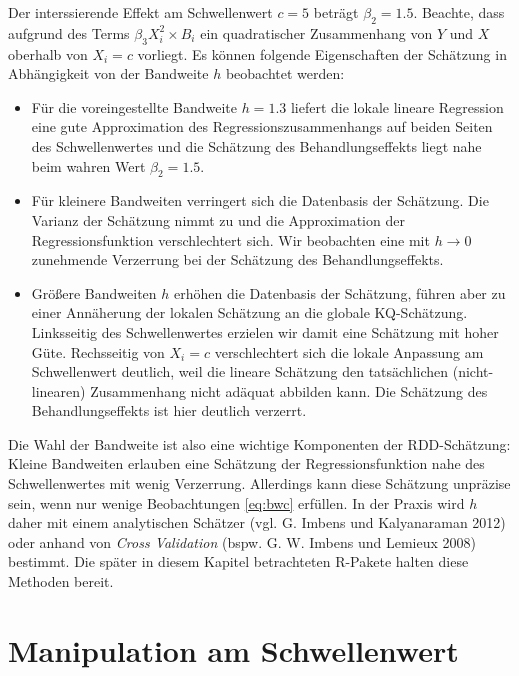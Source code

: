 \documentclass[
  a4paper,
  DIV=11,
  oneside]{scrreprt}
\begin{document}
Der interssierende Effekt am Schwellenwert \(c=5\) beträgt
\(\beta_2 = 1.5\). Beachte, dass aufgrund des Terms
\(\beta_3 X_i^2 \times B_i\) ein quadratischer Zusammenhang von \(Y\)
und \(X\) oberhalb von \(X_i = c\) vorliegt. Es können folgende
Eigenschaften der Schätzung in Abhängigkeit von der Bandweite \(h\)
beobachtet werden:

\begin{itemize}
\item
  Für die voreingestellte Bandweite \(h = 1.3\) liefert die lokale
  lineare Regression eine gute Approximation des
  Regressionszusammenhangs auf beiden Seiten des Schwellenwertes und die
  Schätzung des Behandlungseffekts liegt nahe beim wahren Wert
  \(\beta_2 = 1.5\).
\item
  Für kleinere Bandweiten verringert sich die Datenbasis der Schätzung.
  Die Varianz der Schätzung nimmt zu und die Approximation der
  Regressionsfunktion verschlechtert sich. Wir beobachten eine mit
  \(h\to0\) zunehmende Verzerrung bei der Schätzung des
  Behandlungseffekts.
\item
  Größere Bandweiten \(h\) erhöhen die Datenbasis der Schätzung, führen
  aber zu einer Annäherung der lokalen Schätzung an die globale
  KQ-Schätzung. Linksseitig des Schwellenwertes erzielen wir damit eine
  Schätzung mit hoher Güte. Rechsseitig von \(X_i = c\) verschlechtert
  sich die lokale Anpassung am Schwellenwert deutlich, weil die lineare
  Schätzung den tatsächlichen (nicht-linearen) Zusammenhang nicht
  adäquat abbilden kann. Die Schätzung des Behandlungseffekts ist hier
  deutlich verzerrt.
\end{itemize}

Die Wahl der Bandweite ist also eine wichtige Komponenten der
RDD-Schätzung: Kleine Bandweiten erlauben eine Schätzung der
Regressionsfunktion nahe des Schwellenwertes mit wenig Verzerrung.
Allerdings kann diese Schätzung unpräzise sein, wenn nur wenige
Beobachtungen \eqref{eq:bwc} erfüllen. In der Praxis wird \(h\) daher
mit einem analytischen Schätzer (vgl. G. Imbens und Kalyanaraman 2012)
oder anhand von \emph{Cross Validation} (bspw. G. W. Imbens und Lemieux
2008) bestimmt. Die später in diesem Kapitel betrachteten R-Pakete
halten diese Methoden bereit.

\hypertarget{manipulation-am-schwellenwert}{%
\section{Manipulation am
Schwellenwert}\label{manipulation-am-schwellenwert}}
\end{document}

